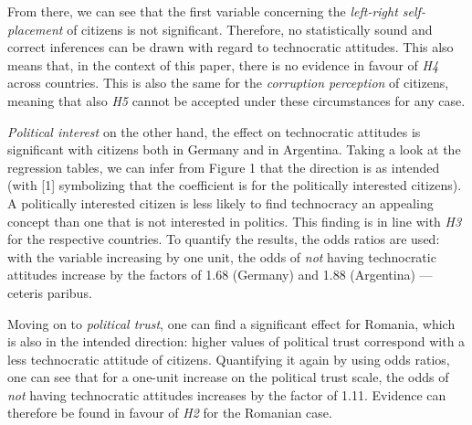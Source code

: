 \documentclass[
  12pt,
  english,
]{article}
\begin{document}
From there, we can see that the first variable concerning the
\emph{left-right self-placement} of citizens is not significant.
Therefore, no statistically sound and correct inferences can be drawn
with regard to technocratic attitudes. This also means that, in the
context of this paper, there is no evidence in favour of \emph{H4}
across countries. This is also the same for the \emph{corruption
perception} of citizens, meaning that also \emph{H5} cannot be accepted
under these circumstances for any case.

\emph{Political interest} on the other hand, the effect on technocratic
attitudes is significant with citizens both in Germany and in Argentina.
Taking a look at the regression tables, we can infer from Figure 1 that
the direction is as intended (with {[}1{]} symbolizing that the
coefficient is for the politically interested citizens). A politically
interested citizen is less likely to find technocracy an appealing
concept than one that is not interested in politics. This finding is in
line with \emph{H3} for the respective countries. To quantify the
results, the odds ratios are used: with the variable increasing by one
unit, the odds of \emph{not} having technocratic attitudes increase by
the factors of 1.68 (Germany) and 1.88 (Argentina) --- ceteris paribus.

Moving on to \emph{political trust}, one can find a significant effect
for Romania, which is also in the intended direction: higher values of
political trust correspond with a less technocratic attitude of
citizens. Quantifying it again by using odds ratios, one can see that
for a one-unit increase on the political trust scale, the odds of
\emph{not} having technocratic attitudes increases by the factor of
1.11. Evidence can therefore be found in favour of \emph{H2} for the
Romanian case.
\end{document}
